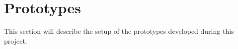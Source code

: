 \section{Prototypes}
This section will describe the setup of the prototypes developed during this project.


\FloatBarrier

\FloatBarrier


